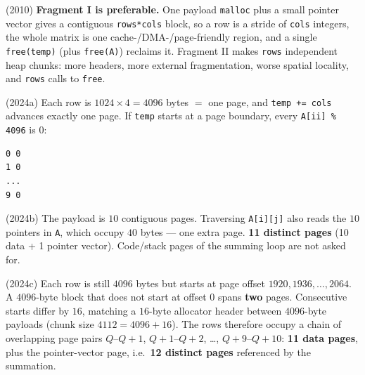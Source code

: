 \documentclass[11pt,a4paper]{article}
\newenvironment{Sol}{%
  \begin{tcolorbox}[sboxstyle, title={Solution}]%
}{%
  \end{tcolorbox}\vspace{0.35em}%
}
\begin{document}
\begin{Sol}
(2010) \textbf{Fragment I is preferable.} One payload
\texttt{malloc} plus a small pointer vector gives a contiguous
\texttt{rows*cols} block, so a row is a stride of \texttt{cols}
integers, the whole matrix is one cache-/DMA-/page-friendly region,
and a single \texttt{free(temp)} (plus \texttt{free(A)}) reclaims it.
Fragment II makes \texttt{rows} independent heap chunks: more
headers, more external fragmentation, worse spatial locality, and
\texttt{rows} calls to \texttt{free}.

(2024a) Each row is $1024\times 4=4096$ bytes $=$ one page, and
\texttt{temp += cols} advances exactly one page. If \texttt{temp}
starts at a page boundary, every \texttt{A[ii] \% 4096} is $0$:
\begin{lstlisting}[numbers=none]
0 0
1 0
...
9 0
\end{lstlisting}

(2024b) The payload is $10$ contiguous pages. Traversing
\texttt{A[i][j]} also reads the $10$ pointers in \texttt{A}, which
occupy $40$ bytes --- one extra page. \textbf{11 distinct pages}
(10 data + 1 pointer vector). Code/stack pages of the summing loop
are not asked for.

(2024c) Each row is still $4096$ bytes but starts at page offset
$1920,1936,\ldots,2064$. A $4096$-byte block that does not start at
offset $0$ spans \textbf{two} pages. Consecutive starts differ by
$16$, matching a $16$-byte allocator header between $4096$-byte
payloads (chunk size $4112=4096+16$). The rows therefore occupy a
chain of overlapping page pairs
$Q$--$Q+1$, $Q+1$--$Q+2$, \ldots, $Q+9$--$Q+10$:
\textbf{11 data pages}, plus the pointer-vector page, i.e.\
\textbf{12 distinct pages} referenced by the summation.
\end{Sol}
\end{document}
